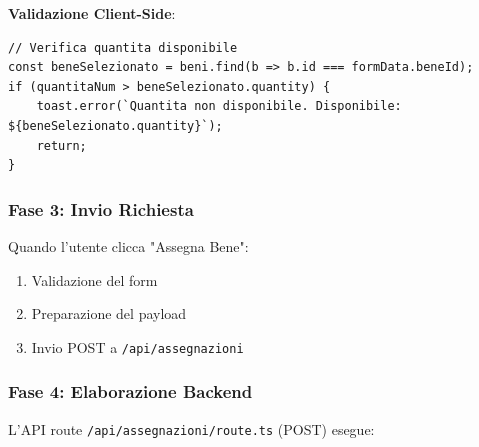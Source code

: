 \documentclass{article}
\begin{document}
\textbf{Validazione Client-Side}:
\begin{lstlisting}
// Verifica quantita disponibile
const beneSelezionato = beni.find(b => b.id === formData.beneId);
if (quantitaNum > beneSelezionato.quantity) {
    toast.error(`Quantita non disponibile. Disponibile: ${beneSelezionato.quantity}`);
    return;
}
\end{lstlisting}

\subsubsection{Fase 3: Invio Richiesta}

Quando l'utente clicca "Assegna Bene":
\begin{enumerate}[leftmargin=*]
\item Validazione del form
\item Preparazione del payload
\item Invio POST a \texttt{/api/assegnazioni}
\end{enumerate}

\subsubsection{Fase 4: Elaborazione Backend}

L'API route \texttt{/api/assegnazioni/route.ts} (POST) esegue:
\end{document}
